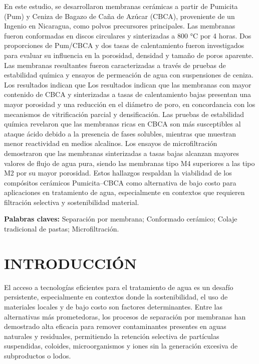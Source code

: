 \documentclass{article}
\begin{document}
\justifying
En este estudio, se desarrollaron membranas cerámicas a partir de 
Pumicita (Pum) y Ceniza de Bagazo de Caña de Azúcar (CBCA), 
proveniente de un Ingenio en Nicaragua, como polvos precursores 
principales. Las membranas fueron conformadas en discos circulares y 
sinterizadas a 800 °C por 4 horas. Dos proporciones de Pum/CBCA y dos 
tasas de calentamiento fueron investigados para evaluar su influencia 
en la porosidad, densidad y tamaño de poros aparente. 
Las membranas resultantes fueron caracterizadas a través de pruebas de 
estabilidad química y ensayos de permeación de agua con suspensiones de 
ceniza. Los resultados indican que Los resultados indican que las 
membranas con mayor contenido de CBCA y sinterizadas a tasas de 
calentamiento bajas presentan una mayor porosidad y una reducción en 
el diámetro de poro, en concordancia con los mecanismos de 
vitrificación parcial y densificación. Las pruebas de estabilidad 
química revelaron que las membranas ricas en CBCA son más 
susceptibles al ataque ácido debido a la presencia de fases solubles, 
mientras que muestran menor reactividad en medios alcalinos. 
Los ensayos de microfiltración demostraron que las membranas 
sinterizadas a tasas bajas alcanzan mayores valores de flujo de agua 
pura, siendo las membranas tipo M4 superiores a las tipo M2 por su 
mayor porosidad. Estos hallazgos respaldan la viabilidad de los 
compósitos cerámicos Pumicita–CBCA como alternativa de bajo costo para 
aplicaciones en tratamiento de agua, especialmente en contextos que 
requieren filtración selectiva y sostenibilidad material.

\textbf{Palabras claves:} Separación por membrana; Conformado cerámico; Colaje tradicional de pastas; Microfiltración. 

\newpage
\section{INTRODUCCIÓN}

El acceso a tecnologías eficientes para el tratamiento de agua es un 
desafío persistente, especialmente en contextos donde la 
sostenibilidad, el uso de materiales locales y de bajo costo son 
factores determinantes. Entre las alternativas más prometedoras, 
los procesos de separación por membranas han demostrado alta eficacia 
para remover contaminantes presentes en aguas naturales y residuales, 
permitiendo la retención selectiva de partículas suspendidas, coloides, 
microorganismos y iones sin la generación excesiva de subproductos o 
lodos.
\end{document}
